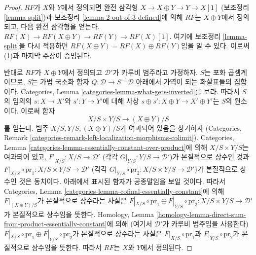 \begin{proof}
$RF$가 $X$와 $Y$에서 정의되면 완전 삼각형
$X \to X \oplus Y \to Y \to X[1]$ (보조정리 \ref{lemma-split})과
보조정리 \ref{lemma-2-out-of-3-defined}에 의해 $RF$는
$X \oplus Y$에서 정의되고, 다음 완전 삼각형을 얻는다.
$RF(X) \to RF(X \oplus Y) \to RF(Y) \to RF(X)[1]$.
여기에 보조정리 \ref{lemma-split}을 다시 적용하면
$RF(X \oplus Y) = RF(X) \oplus RF(Y)$임을 알 수 있다.
이로써 (1)과 마지막 주장이 증명된다.

\medskip\noindent
반대로 $RF$가 $X \oplus Y$에서 정의되고 $\mathcal{D}'$가 카루비 범주라고
가정하자. $S$는 포화 곱셈계이므로, $S$는 가법 국소화 함자
$Q : \mathcal{D} \to S^{-1}\mathcal{D}$ 아래에서 가역이 되는 화살표들의
집합이다. Categories, Lemma
\ref{categories-lemma-what-gets-inverted}를 보라. 따라서 $S$의 임의의
$s : X \to X'$와 $s' : Y \to Y'$에 대해 사상
$s \oplus s' : X \oplus Y \to X' \oplus Y'$는 $S$의 원소이다.
이로써 함자
$$
X/S \times Y/S \longrightarrow (X \oplus Y)/S
$$
를 얻는다. 범주 $X/S, Y/S, (X \oplus Y)/S$가 여과되어 있음을 상기하자
(Categories, Remark
\ref{categories-remark-left-localization-morphisms-colimit}).
Categories, Lemma \ref{categories-lemma-essentially-constant-over-product}에
의해 $X/S \times Y/S$는 여과되어 있고,
$F|_{X/S} : X/S \to \mathcal{D}'$ (각각
$G|_{Y/S} : Y/S \to \mathcal{D}'$)가 본질적으로 상수인 것과
$F|_{X/S} \circ \text{pr}_1 : X/S \times Y/S \to \mathcal{D}'$
(각각 $G|_{Y/S} \circ \text{pr}_2 : X/S \times Y/S \to \mathcal{D}'$)가
본질적으로 상수인 것은 동치이다. 아래에서 표시된 함자가 공종말임을
보일 것이다. 따라서 Categories, Lemma
\ref{categories-lemma-cofinal-essentially-constant}에 의해
$F|_{(X \oplus Y)/S}$가 본질적으로 상수라는 사실은
$F|_{X/S} \circ \text{pr}_1 \oplus F|_{Y/S} \circ \text{pr}_2 :
X/S \times Y/S \to \mathcal{D}'$가 본질적으로 상수임을 뜻한다.
Homology, Lemma
\ref{homology-lemma-direct-sum-from-product-essentially-constant}에 의해
(여기서 $\mathcal{D}'$가 카루비 범주임을 사용한다)
$F|_{X/S} \circ \text{pr}_1 \oplus F|_{Y/S} \circ \text{pr}_2$가
본질적으로 상수라는 사실은 $F|_{X/S} \circ \text{pr}_1$과
$F|_{Y/S} \circ \text{pr}_2$가 본질적으로 상수임을 뜻한다.
따라서 $RF$는 $X$와 $Y$에서 정의된다.


\end{proof}
